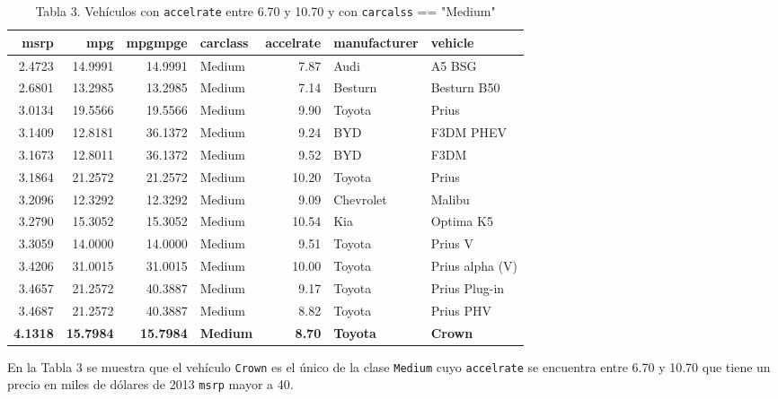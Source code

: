 \documentclass[11pt]{article}
\begin{document}
    
    \begin{table}[!hb]
        \centering
        \begin{tabular}{rrrlrll}
            \toprule
            msrp &      mpg &  mpgmpge & carclass &  accelrate & manufacturer &          vehicle \\
            \midrule
            2.4723 &  14.9991 &  14.9991 &   Medium &       7.87 &         Audi &           A5 BSG \\
            2.6801 &  13.2985 &  13.2985 &   Medium &       7.14 &      Besturn &    Besturn B50   \\
            3.0134 &  19.5566 &  19.5566 &   Medium &       9.90 &       Toyota &            Prius \\
            3.1409 &  12.8181 &  36.1372 &   Medium &       9.24 &          BYD &        F3DM PHEV \\
            3.1673 &  12.8011 &  36.1372 &   Medium &       9.52 &          BYD &             F3DM \\
            3.1864 &  21.2572 &  21.2572 &   Medium &      10.20 &       Toyota &            Prius \\
            3.2096 &  12.3292 &  12.3292 &   Medium &       9.09 &    Chevrolet &           Malibu \\
            3.2790 &  15.3052 &  15.3052 &   Medium &      10.54 &          Kia &        Optima K5 \\
            3.3059 &  14.0000 &  14.0000 &   Medium &       9.51 &       Toyota &          Prius V \\
            3.4206 &  31.0015 &  31.0015 &   Medium &      10.00 &       Toyota &  Prius alpha (V) \\
            3.4657 &  21.2572 &  40.3887 &   Medium &       9.17 &       Toyota &    Prius Plug-in \\
            3.4687 &  21.2572 &  40.3887 &   Medium &       8.82 &       Toyota &        Prius PHV \\
            \textbf{4.1318} &  \textbf{15.7984} &  \textbf{15.7984} &   \textbf{Medium} &       \textbf{8.70} &       \textbf{Toyota} &            \textbf{Crown} \\
            \bottomrule
        \end{tabular}
        \caption*{Tabla 3. Vehículos con \texttt{accelrate} entre 6.70 y 10.70 y con \texttt{carcalss} == "Medium"}
    \end{table}

    
    En la Tabla 3 se muestra que el vehículo \texttt{Crown} es el único de
la clase \texttt{Medium} cuyo \texttt{accelrate} se encuentra entre 6.70
y 10.70 que tiene un precio en miles de dólares de 2013 \texttt{msrp}
mayor a 40.
\end{document}
